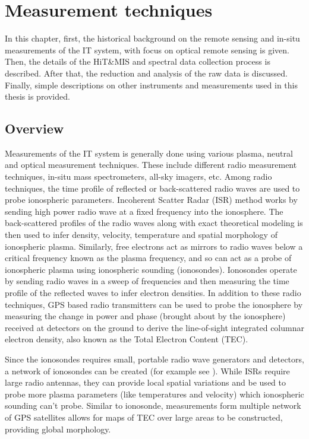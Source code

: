 \documentclass[crop=false,class=mitthesis,oneside,font=12pt]{standalone}
\begin{document}
\chapter{Measurement techniques}
In this chapter, first, the historical background on the remote sensing and in-situ measurements of the IT system, with focus on optical remote sensing is given. Then, the details of the HiT\&MIS and spectral data collection process is described. After that, the reduction and analysis of the raw data is discussed. Finally, simple descriptions on other instruments and measurements used in this thesis is provided.
\label{chap:background}
\section{Overview}
Measurements of the IT system is generally done using various plasma, neutral and optical measurement techniques. These include different radio measurement techniques, in-situ mass spectrometers, all-sky imagers, etc. Among radio techniques, the time profile of reflected or back-scattered radio waves are used to probe ionospheric parameters. Incoherent Scatter Radar (ISR) method works by sending high power radio wave at a fixed frequency into the ionosphere. The back-scattered profiles of the radio waves along with exact theoretical modeling is then used to infer density, velocity, temperature and spatial morphology of ionospheric plasma. Similarly, free electrons act as mirrors to radio waves below a critical frequency known as the plasma frequency, and so can act as a probe of ionospheric plasma using ionospheric sounding (ionosondes). Ionosondes operate by sending radio waves in a sweep of frequencies and then measuring the time profile of the reflected waves to infer electron densities. In addition to these radio techniques, GPS based radio transmitters can be used to probe the ionosphere by measuring the change in power and phase (brought about by the ionosphere) received at detectors on the ground to derive the line-of-sight integrated columnar electron density, also known as the Total Electron Content (TEC). 

Since the ionosondes requires small, portable radio wave generators and detectors, a network of ionosondes can be created (for example see \citet{giro}). While ISRs require large radio antennas, they can provide local spatial variations and be used to probe more plasma parameters (like temperatures and velocity) which ionospheric sounding can't probe. Similar to ionosonde, measurements form multiple network of GPS satellites allows for maps of TEC over large areas to be constructed, providing global morphology. 
\end{document}
